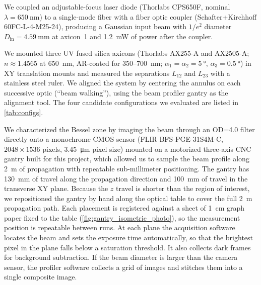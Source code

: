 \documentclass[
  aps,
  twocolumn,
  reprint,              %
  superscriptaddress,
  amsmath,
  amssymb,
  floatfix,
  longbibliography,      %
  nofootinbib %
]{revtex4-2}
\begin{document}
We coupled an adjustable-focus laser diode (Thorlabs CPS650F, nominal
$\lambda = \SI{650}{\nano\meter}$) to a single-mode fiber with a fiber
optic coupler (Schafter+Kirchhoff 60FC-L-4-M25-24), producing a Gaussian
input beam with $1/e^2$ diameter $D_{\text{in}} = \SI{4.59}{\milli\meter}$
at axicon~1 and \SI{1.2}{\milli\watt} of power after the coupler.

We mounted three UV fused silica axicons (Thorlabs AX255-A and AX2505-A;
$n \approx 1.4565$ at \SI{650}{\nano\meter}, AR-coated for
350--\SI{700}{\nano\meter}; $\alpha_1 = \alpha_2 = \SI{5}{\degree}$,
$\alpha_3 = \SI{0.5}{\degree}$) in XY translation mounts and measured the
separations $L_{12}$ and $L_{23}$ with a stainless steel ruler. We
aligned the system by centering the annulus on each successive optic
(``beam walking''), using the beam profiler gantry as the alignment
tool. The four candidate configurations we evaluated are listed in
\autoref{tab:configs}.

We characterized the Bessel zone by imaging the beam through an OD=4.0
filter directly onto a monochrome CMOS sensor (FLIR BFS-PGE-31S4M-C,
$2048 \times 1536$ pixels, \SI{3.45}{\micro\meter} pixel size) mounted
on a motorized three-axis CNC gantry built for this project, which allowed us to sample the beam profile along \SI{2}{\meter} of propagation with repeatable sub-millimeter positioning. The gantry has \SI{130}{\milli\meter} of travel along the propagation direction and \SI{100}{\milli\meter} of travel in the transverse XY plane. Because the $z$ travel is shorter than the region of interest, we repositioned the gantry by hand along the optical table to cover the full \SI{2}{\meter} propagation path. Each placement is registered against a sheet of \SI{1}{\centi\meter} graph paper fixed to the table (\autoref{fig:gantry_isometric_photo}), so the measurement position is repeatable between runs. At each plane the acquisition software locates the beam and sets the exposure time automatically, so that the brightest pixel in the plane falls below a saturation threshold. It also collects dark frames for background subtraction. If the beam diameter is larger than the camera sensor, the profiler software collects a grid of images and stitches them into a single composite image.
\end{document}
